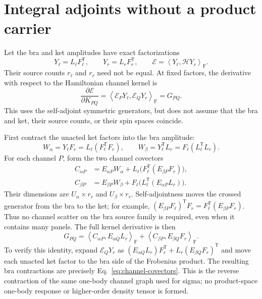 \documentclass[11pt,a4paper]{article}
\newcommand{\Tr}{^{\mathsf T}}
\newcommand{\ip}[2]{\left\langle #1,#2\right\rangle_{\mathrm F}}
\newcommand{\Ha}{\mathcal H}
\newcommand{\Ea}{\mathcal E}
\begin{document}
\section{Integral adjoints without a product carrier}\label{sec:factor-adjoint}

Let the bra and ket amplitudes have exact factorizations
\begin{equation}
 Y_\ell=L_\ell F_\ell\Tr,\qquad Y_r=L_r F_r\Tr,
 \qquad \mathscr E=\ip{Y_\ell}{\Ha Y_r}.
\end{equation}
Their source counts $r_\ell$ and $r_r$ need not be equal. At fixed factors,
the derivative with respect to the Hamiltonian channel kernel is
\begin{equation}\label{eq:kernel-adjoint}
 \frac{\partial\mathscr E}{\partial K_{PQ}}=
 \ip{\Ea_PY_\ell}{\Ea_QY_r}=G_{PQ}.
\end{equation}
This uses the self-adjoint symmetric generators, but does not assume that
the bra and ket, their source counts, or their spin spaces coincide.

First contract the unacted ket factors into the bra amplitude:
\begin{equation}\label{eq:weighted-bra}
 W_\alpha=Y_\ell F_r=L_\ell(F_\ell\Tr F_r),\qquad
 W_\beta=Y_\ell\Tr L_r=F_\ell(L_\ell\Tr L_r).
\end{equation}
For each channel $P$, form the two channel covectors
\begin{align}\label{eq:channel-covectors}
 C_{\alpha P}&=E_{\alpha P}W_\alpha
            +L_\ell\bigl(F_\ell\Tr(E_{\beta P}F_r)\bigr),\\
 C_{\beta P}&=E_{\beta P}W_\beta
            +F_\ell\bigl(L_\ell\Tr(E_{\alpha P}L_r)\bigr).
\end{align}
Their dimensions are $U_\alpha\times r_r$ and $U_\beta\times r_r$.
Self-adjointness moves the crossed generator from the bra to the ket;
for example, $(E_{\beta P}F_\ell)\Tr F_r
=F_\ell\Tr(E_{\beta P}F_r)$. Thus no channel scatter on the bra
source family is required, even when it contains many panels.
The full kernel derivative is then
\begin{equation}\label{eq:factor-kernel-adjoint}
 \boxed{\quad G_{PQ}=
 \ip{C_{\alpha P}}{E_{\alpha Q}L_r}
 +\ip{C_{\beta P}}{E_{\beta Q}F_r}.\quad}
\end{equation}
To verify this identity, expand $\Ea_QY_r$ as
$(E_{\alpha Q}L_r)F_r\Tr+L_r(E_{\beta Q}F_r)\Tr$ and move each
unacted ket factor to the bra side of the Frobenius product. The resulting
bra contractions are precisely Eq.~\eqref{eq:channel-covectors}. This is
the reverse contraction of the same one-body channel graph used for sigma;
no product-space one-body response or higher-order density tensor is formed.
\end{document}
